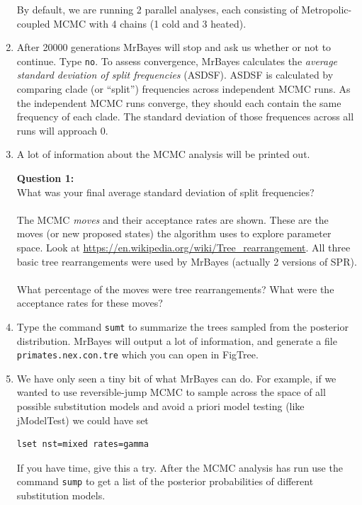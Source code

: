 \documentclass[11pt]{article}
\begin{document}
\begin{enumerate}
By default, we are running 2 parallel analyses, each consisting
of Metropolic-coupled MCMC with 4 chains (1 cold and 3 heated).

\item After 20000 generations MrBayes will stop and ask us whether or not to
continue. Type \texttt{no}.
To assess convergence, MrBayes calculates the \textit{average standard deviation of split frequencies} (ASDSF).
ASDSF is calculated by comparing clade (or ``split'') 
frequencies across independent MCMC runs.
As the independent MCMC runs converge, they should
each contain the same frequency of each clade.
The standard deviation of those frequences across all runs will approach 0.

\item A lot of information about the MCMC analysis will be printed out.



\begin{framed}
\noindent
\textbf{Question 1:} \\
What was your final average standard deviation of split frequencies? \\
\\
The MCMC \textit{moves} and their acceptance rates are shown.
These are the moves (or new proposed states) the algorithm uses to explore
parameter space. Look at \url{https://en.wikipedia.org/wiki/Tree_rearrangement}.
All three basic tree rearrangements were used by MrBayes 
(actually 2 versions of SPR). \\
\\
What percentage of the moves were tree rearrangements?
What were the acceptance rates for these moves?
\end{framed}

\item Type the command \texttt{sumt} to summarize the trees
sampled from the posterior distribution. MrBayes will output
a lot of information, and generate a file \texttt{primates.nex.con.tre}
which you can open in FigTree.

\item We have only seen a tiny bit of what MrBayes can do. For example,
if we wanted to use reversible-jump MCMC to
sample across the space of all possible substitution models
and avoid a priori model testing (like jModelTest)
we could have set

\begin{verbatim}
lset nst=mixed rates=gamma
\end{verbatim}

If you have time, give this a try. After the MCMC analysis has run
use the command \texttt{sump} to get a list of the posterior probabilities
of different substitution models.

\end{enumerate}
\end{document}
